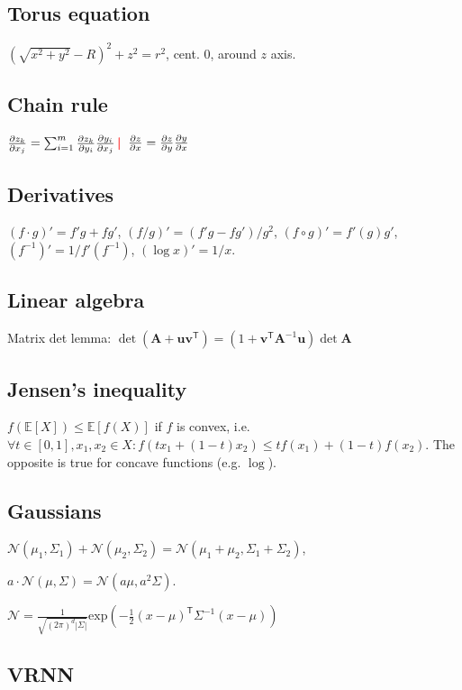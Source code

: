 \documentclass[11pt,landscape,a4paper,fleqn]{article}
\newcommand*{\tran}{^{\mathsf{T}}} %
\newcommand{\E}{\mathbb{E}}
\renewcommand{\exp}{\mathrm{exp}}
\newcommand{\sep}{\,\textcolor{red}{\bm|}\,}
\def\myvector#1{\mathbf{#1}}
\def\vu{{\myvector{u}}}
\def\vv{{\myvector{v}}}
\def\mymatrix#1{\mathbf{#1}}
\def\mA{{\mymatrix{A}}}
\begin{document}
\begin{multicols*}{4}
\subsection*{Torus equation}

\!\!\!\!$(\sqrt{x^2 + y^2} - R)^2 + z^2 = r^2$, cent. $0$, around $z$ axis.

\subsection*{Chain rule}
$\pdv{z_k}{x_j} = \sum_{i=1}^{m} \pdv{z_k}{y_i} \pdv{y_i}{x_j} \sep$
$\pdv{z}{x} = \pdv{z}{y} \pdv{y}{x}$


\subsection*{Derivatives}

$(f \cdot g)' = f'g + fg'$,
$(f / g)' = (f'g - fg') / g^2$,
$(f \circ g)' = f'(g)g'$,
$(f^{-1})' = 1 / f'(f^{-1})$,
$(\log x)' = 1 / x$.

\subsection*{Linear algebra}

Matrix det lemma: $\det(\mA + \vu\vv\tran) = (1 + \vv\tran \mA^{-1}\vu) \det \mA$

\subsection*{Jensen's inequality}
$f(\E[X]) \leq \E[f(X)]$ if $f$ is convex, i.e. $\forall t \in [0, 1], x_1, x_2 \in X : f(tx_1 + (1 - t)x_2) \leq tf(x_1) + (1 - t)f(x_2)$.
The opposite is true for concave functions (e.g. $\log$).


\subsection*{Gaussians}

$\mathcal{N}(\mu_1, \Sigma_1) + \mathcal{N}(\mu_2, \Sigma_2)
= \mathcal{N}(\mu_1 + \mu_2, \Sigma_1 + \Sigma_2)$,

$a \cdot \mathcal{N}(\mu, \Sigma) = \mathcal{N}(a\mu, a^2\Sigma)$.

$\mathcal{N} = \frac{1}{\sqrt{(2\pi)^d |\Sigma|}} \exp( - \frac{1}{2} (x - \mu)\tran \Sigma^{-1} (x - \mu))$

\subsection*{VRNN}


\end{multicols*}
\end{document}
